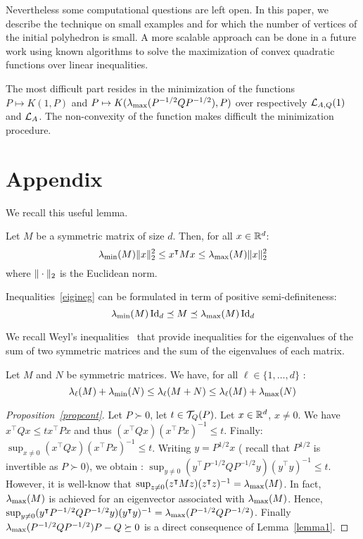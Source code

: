 \documentclass[10pt]{llncs}
\begin{document}
Nevertheless some computational questions are left open. In this paper, we describe the technique on small examples and for which the number of vertices of the initial polyhedron is small. A more scalable approach can be done in a future work using known algorithms to solve the maximization of convex quadratic functions over linear inequalities. 

The most  difficult part resides in the minimization of the functions $P\mapsto K(1,P)$ and $P\mapsto K(\lambda_{\operatorname{max}}(P^{-1/2} Q P^{-1/2}),P)$ over respectively $\mathcal{L}_{A,Q}(1)$ and $\mathcal{L}_{A}$. The non-convexity of the function makes difficult the minimization procedure.         



\newpage

\section*{Appendix}

We recall this useful lemma.

\begin{lemma}
\label{lemma1}
Let $M$ be a symmetric matrix of size $d$. 
Then, for all $x\in \mathbb R^d$:
\begin{equation}
\label{eigineg}
\lambda_{\operatorname{min}}(M)\| x\|_2^2\leq x^\intercal M x\leq \lambda_{\operatorname{max}}(M) \| x\|_2^2
\end{equation}
where $\| \cdot\|_2$ is the Euclidean norm. 
\end{lemma}
Inequalities~\eqref{eigineg} can be formulated in term of positive semi-definiteness:
\[
\lambda_{\operatorname{min}}(M)\operatorname{Id}_d\preceq M\preceq \lambda_{\operatorname{max}}(M)\operatorname{Id}_d
\]

We recall Weyl's inequalities~\cite{horn1990matrix} that provide inequalities for the eigenvalues of the sum of two symmetric matrices and the sum of the eigenvalues of each matrix.  
\begin{lemma}
\label{lemmaWeyl}
Let $M$ and $N$ be symmetric matrices. We have, for all $\ell\in\{1,\ldots,d\}$ :
\[
\lambda_\ell(M)+\lambda_{\operatorname{min}}(N)\leq \lambda_\ell(M+N)\leq \lambda_\ell(M)+\lambda_{\operatorname{max}}(N)
\]
\end{lemma}

\begin{proof}[Proposition~\ref{propcont}]
Let $P\succ 0$, let $t\in\mathcal{T}_{Q}(P)$. Let $x\in\mathbb R^d$, $x\neq 0$. We have 
$x^\intercal Q x\leq t x^\intercal P x$ and thus $(x^\intercal Q x)(x^\intercal P x)^{-1}\leq t$. Finally:
$\sup_{x\neq 0}(x^\intercal Q x)(x^\intercal P x)^{-1}\leq t $. Writing $y=P^{1/2}x$ ( recall that $P^{1/2}$ is invertible as $P\succ 0$), we obtain :
$\sup_{y\neq 0}(y^\intercal P^{-1/2}Q P^{-1/2}y)(y^\intercal y)^{-1}\leq t $. However, it is well-know that
$\sup_{z\neq 0} (z^\intercal M z)(z^\intercal z)^{-1}=\lambda_{\operatorname{max}}(M)$. In fact, $\lambda_{\operatorname{max}}(M)$ is achieved for an eigenvector associated with $\lambda_{\operatorname{max}}(M)$. Hence, 
$\sup_{y\neq 0} (y^\intercal P^{-1/2}Q P^{-1/2}y)(y^\intercal y)^{-1}=\lambda_{\operatorname{max}}(P^{-1/2} Q P^{-1/2})$. Finally $\lambda_{\operatorname{max}}(P^{-1/2} Q P^{-1/2})P-Q\succeq 0$ is a direct consequence of Lemma~\ref{lemma1}. 
\end{proof}
\end{document}
